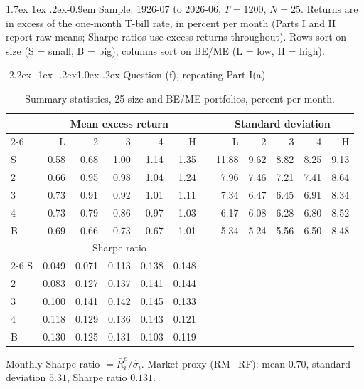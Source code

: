\documentclass[11pt]{article}
\makeatletter
\renewcommand\subsection{\@startsection{subsection}{2}{0pt}%
  {-2.2ex \@plus -1ex \@minus -.2ex}{1.0ex \@plus .2ex}%
  {\normalfont\bfseries\normalsize\color{psink}}}
\renewcommand\paragraph{\@startsection{paragraph}{4}{0pt}%
  {1.7ex \@plus 1ex \@minus .2ex}{-0.9em}%
  {\normalfont\bfseries\normalsize\color{psink}}}
\makeatother
\begin{document}
\paragraph{Sample.} 1926-07 to 2026-06, $T = 1200$, $N = 25$. Returns are in excess of the one-month T-bill rate, in percent per month (Parts I and II report raw means; Sharpe ratios use excess returns throughout). Rows sort on size
(S = small, B = big); columns sort on BE/ME (L = low, H = high).

\subsection{Question (f), repeating Part I(a)}

\begin{table}[H]
\centering
\caption{Summary statistics, 25 size and BE/ME portfolios, percent per month.}
\small
\begin{tabular}{lrrrrrcrrrrr}
\toprule
& \multicolumn{5}{c}{Mean excess return} && \multicolumn{5}{c}{Standard deviation} \\
\cmidrule{2-6}\cmidrule{8-12}
& L & 2 & 3 & 4 & H && L & 2 & 3 & 4 & H \\
\midrule
S & 0.58 & 0.68 & 1.00 & 1.14 & 1.35 && 11.88 & 9.62 & 8.82 & 8.25 & 9.13 \\
2 & 0.66 & 0.95 & 0.98 & 1.04 & 1.24 &&  7.96 & 7.46 & 7.21 & 7.41 & 8.64 \\
3 & 0.73 & 0.91 & 0.92 & 1.01 & 1.11 &&  7.34 & 6.47 & 6.45 & 6.91 & 8.34 \\
4 & 0.73 & 0.79 & 0.86 & 0.97 & 1.03 &&  6.17 & 6.08 & 6.28 & 6.80 & 8.52 \\
B & 0.69 & 0.66 & 0.73 & 0.67 & 1.01 &&  5.34 & 5.24 & 5.56 & 6.50 & 8.48 \\
\midrule
& \multicolumn{5}{c}{Sharpe ratio} && \multicolumn{5}{c}{} \\
\cmidrule{2-6}
S & 0.049 & 0.071 & 0.113 & 0.138 & 0.148 &&&&&& \\
2 & 0.083 & 0.127 & 0.137 & 0.141 & 0.144 &&&&&& \\
3 & 0.100 & 0.141 & 0.142 & 0.145 & 0.133 &&&&&& \\
4 & 0.118 & 0.129 & 0.136 & 0.143 & 0.121 &&&&&& \\
B & 0.130 & 0.125 & 0.131 & 0.103 & 0.119 &&&&&& \\
\bottomrule
\end{tabular}
\label{tab:p3f_stats}
\vspace{2pt}\begin{minipage}{0.93\textwidth}\footnotesize
Monthly Sharpe ratio $= \bar R^e_i/\hat\sigma_i$. Market proxy (RM$-$RF):
mean $0.70$, standard deviation $5.31$, Sharpe ratio $0.131$.
\end{minipage}
\end{table}
\end{document}
